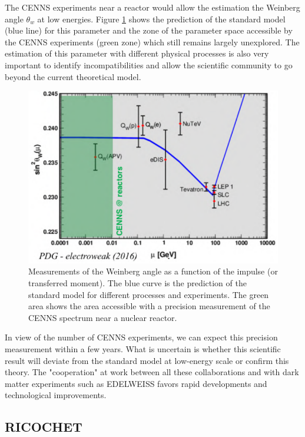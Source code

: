 The CENNS experiments near a reactor would allow the estimation the Weinberg angle $\theta_w$ at low energies. Figure \ref{fig:weinberg-angle} shows the prediction of the standard model (blue line) for this parameter and the zone of the parameter space accessible by the CENNS experiments (green zone) which still remains largely unexplored. The estimation of this parameter with different physical processes is also very important to identify incompatibilities and allow the scientific community to go beyond the current theoretical model.

\begin{figure}
\centering
\includegraphics[scale=1]{Figures/Introduction/weinberg_angle.pdf}
\caption{Measurements of the Weinberg angle as a function of the impulse (or transferred moment). The blue curve is the prediction of the standard model for different processes and experiments. The green area shows the area accessible with a precision measurement of the CENNS spectrum near a nuclear reactor.}
\label{fig:weinberg-angle}
\end{figure}

In view of the number of CENNS experiments, we can expect this precision measurement within a few years. What is uncertain is whether this scientific result will deviate from the standard model at low-energy scale or confirm this theory. The "cooperation" at work between all these collaborations and with dark matter experiments such as EDELWEISS favors rapid developments and technological improvements.


\subsection{RICOCHET}

